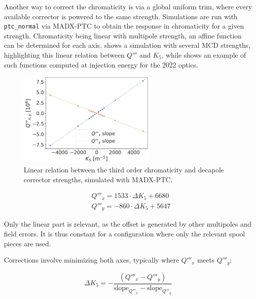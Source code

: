 Another way to correct the chromaticity is via a global uniform trim, where every available
corrector is powered to the same strength.  Simulations are run with \verb|ptc_normal| via MADX-PTC
to obtain the response in chromaticity for a given strength. Chromaticity being linear with
multipole strength, an affine function can be determined for each axis.
 shows a simulation with several MCD strengths, highlighting this
linear relation between $Q'''$ and $K_5$, while
 shows an example of such functions computed
at injection energy for the 2022 optics.

\begin{figure}[H]
  \centering
  \includegraphics[width=0.6\textwidth]{images/dq3_k5.pdf}
  \caption{Linear relation between the third order chromaticity and decapole corrector strengths,
           simulated with MADX-PTC.}
  \label{fig:corrections-dq3_versus_k5}
\end{figure}

\begin{equation}
  \begin{aligned}
    &Q'''_x = 1533 \cdot \Delta K_5 + 6680 \\
    &Q'''_y = -860 \cdot \Delta K_5 + 5647
  \end{aligned}
  \label{eq:corrections:chromaticity_affine_function_ptc}
\end{equation}

Only the linear part is relevant, as the offset is generated by other multipoles and field errors.
It is thus constant for a configuration where only the relevant spool pieces are used.

Corrections involve minimizing both axes, typically where $Q'''_x$ meets $Q'''_y$:

\begin{equation}
  \Delta K_5 = -\frac{(Q'''_x - Q'''_y)}{\text{slope}_{Q'''_x} - \text{slope}_{Q'''_y}}
  \label{eq:corrections:chromaticity_global_correction}
\end{equation}